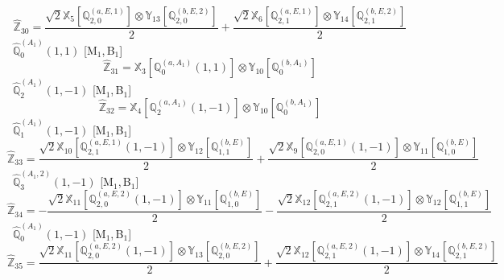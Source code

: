 \documentclass[fleqn,10pt,landscape]{article}
\begin{document}
\begin{itemize}
\begin{dmath*}
\hat{\mathbb{Z}}_{30}=\frac{\sqrt{2} \mathbb{X}_{5}[\mathbb{Q}_{2,0}^{(a,E,1)}] \otimes\mathbb{Y}_{13}[\mathbb{Q}_{2,0}^{(b,E,2)}]}{2} + \frac{\sqrt{2} \mathbb{X}_{6}[\mathbb{Q}_{2,1}^{(a,E,1)}] \otimes\mathbb{Y}_{14}[\mathbb{Q}_{2,1}^{(b,E,2)}]}{2}
\end{dmath*}
\vspace{4mm}
\noindent {} $\,\,\,\hat{\mathbb{Q}}_{0}^{(A_{1})}(1,1)$ [M$_{1}$,\,B$_{1}$]
\begin{dmath*}
\hat{\mathbb{Z}}_{31}=\mathbb{X}_{3}[\mathbb{Q}_{0}^{(a,A_{1})}(1,1)] \otimes\mathbb{Y}_{10}[\mathbb{Q}_{0}^{(b,A_{1})}]
\end{dmath*}
\vspace{4mm}
\noindent {} $\,\,\,\hat{\mathbb{Q}}_{2}^{(A_{1})}(1,-1)$ [M$_{1}$,\,B$_{1}$]
\begin{dmath*}
\hat{\mathbb{Z}}_{32}=\mathbb{X}_{4}[\mathbb{Q}_{2}^{(a,A_{1})}(1,-1)] \otimes\mathbb{Y}_{10}[\mathbb{Q}_{0}^{(b,A_{1})}]
\end{dmath*}
\vspace{4mm}
\noindent {} $\,\,\,\hat{\mathbb{Q}}_{1}^{(A_{1})}(1,-1)$ [M$_{1}$,\,B$_{1}$]
\begin{dmath*}
\hat{\mathbb{Z}}_{33}=\frac{\sqrt{2} \mathbb{X}_{10}[\mathbb{Q}_{2,1}^{(a,E,1)}(1,-1)] \otimes\mathbb{Y}_{12}[\mathbb{Q}_{1,1}^{(b,E)}]}{2} + \frac{\sqrt{2} \mathbb{X}_{9}[\mathbb{Q}_{2,0}^{(a,E,1)}(1,-1)] \otimes\mathbb{Y}_{11}[\mathbb{Q}_{1,0}^{(b,E)}]}{2}
\end{dmath*}
\vspace{4mm}
\noindent {} $\,\,\,\hat{\mathbb{Q}}_{3}^{(A_{1},2)}(1,-1)$ [M$_{1}$,\,B$_{1}$]
\begin{dmath*}
\hat{\mathbb{Z}}_{34}=- \frac{\sqrt{2} \mathbb{X}_{11}[\mathbb{Q}_{2,0}^{(a,E,2)}(1,-1)] \otimes\mathbb{Y}_{11}[\mathbb{Q}_{1,0}^{(b,E)}]}{2} - \frac{\sqrt{2} \mathbb{X}_{12}[\mathbb{Q}_{2,1}^{(a,E,2)}(1,-1)] \otimes\mathbb{Y}_{12}[\mathbb{Q}_{1,1}^{(b,E)}]}{2}
\end{dmath*}
\vspace{4mm}
\noindent {} $\,\,\,\hat{\mathbb{Q}}_{0}^{(A_{1})}(1,-1)$ [M$_{1}$,\,B$_{1}$]
\begin{dmath*}
\hat{\mathbb{Z}}_{35}=\frac{\sqrt{2} \mathbb{X}_{11}[\mathbb{Q}_{2,0}^{(a,E,2)}(1,-1)] \otimes\mathbb{Y}_{13}[\mathbb{Q}_{2,0}^{(b,E,2)}]}{2} + \frac{\sqrt{2} \mathbb{X}_{12}[\mathbb{Q}_{2,1}^{(a,E,2)}(1,-1)] \otimes\mathbb{Y}_{14}[\mathbb{Q}_{2,1}^{(b,E,2)}]}{2}
\end{dmath*}
\vspace{4mm}

\end{itemize}
\end{document}
